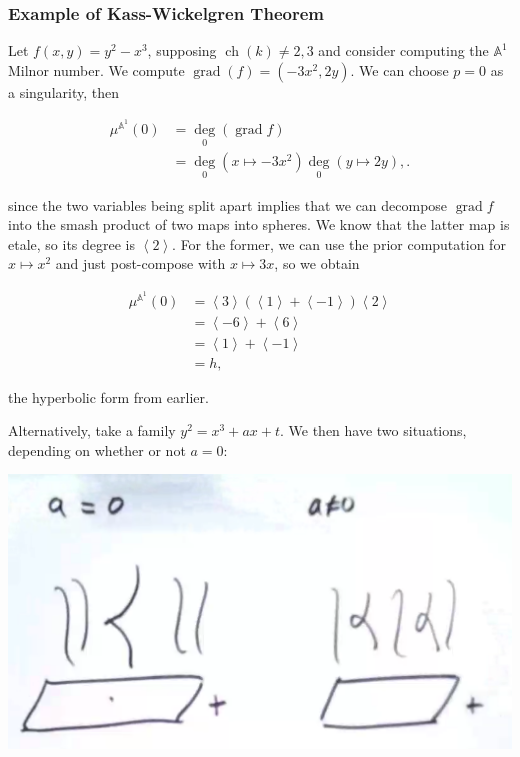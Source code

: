\hypertarget{example-of-kass-wickelgren-theorem}{%
\subsubsection{Example of Kass-Wickelgren
Theorem}\label{example-of-kass-wickelgren-theorem}}

Let \(f(x,y) = y^2-x^3\), supposing \(\operatorname{ch}(k) \neq 2,3\)
and consider computing the \({\mathbb{A}}^1\) Milnor number. We compute
\(\operatorname{grad}(f) = (-3x^2, 2y)\). We can choose \(p=0\) as a
singularity, then

\begin{align*} \mu^{{\mathbb{A}}^1}(0) &= \underset 0 \deg(\operatorname{grad}f) \\ &= \underset 0 \deg(x\mapsto -3x^2) \underset 0 \deg(y\mapsto 2y), .\end{align*}

since the two variables being split apart implies that we can decompose
\(\operatorname{grad}f\) into the smash product of two maps into
spheres. We know that the latter map is etale, so its degree is
\(\left\langle{2}\right\rangle\). For the former, we can use the prior
computation for \(x\mapsto x^2\) and just post-compose with
\(x\mapsto 3x\), so we obtain

\begin{align*} \mu^{{\mathbb{A}}^1}(0) &= \left\langle{3}\right\rangle(\left\langle{1}\right\rangle + \left\langle{-1}\right\rangle) \left\langle{2}\right\rangle \\ &= \left\langle{-6}\right\rangle + \left\langle{6}\right\rangle\\ &= \left\langle{1}\right\rangle + \left\langle{-1}\right\rangle\\ &= h, \end{align*}

the hyperbolic form from earlier.

Alternatively, take a family \(y^2 = x^3 + ax + t\). We then have two
situations, depending on whether or not \(a=0\):

\includegraphics{assets/2019-03-09-12-44-39.png}\\


